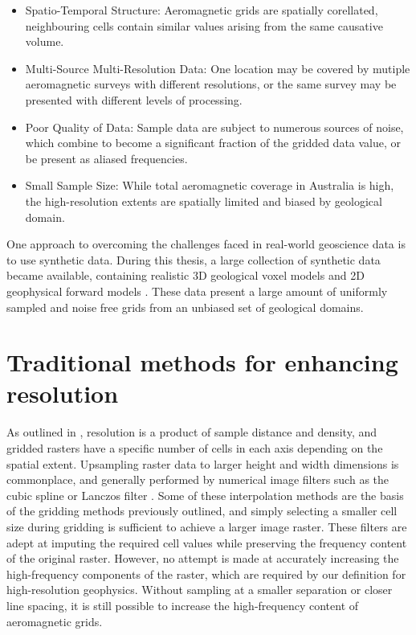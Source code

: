 \documentclass[manuscript.tex]{subfiles}
\begin{document}
\begin{itemize}
    \item{} Spatio-Temporal Structure: Aeromagnetic grids are spatially corellated, neighbouring cells contain similar values arising from the same causative volume.
    \item{} Multi-Source Multi-Resolution Data: One location may be covered by mutiple aeromagnetic surveys with different resolutions, or the same survey may be presented with different levels of processing.
    \item{} Poor Quality of Data: Sample data are subject to numerous sources of noise, which combine to become a significant fraction of the gridded data value, or be present as aliased frequencies.
    \item{} Small Sample Size: While total aeromagnetic coverage in Australia is high, the high-resolution extents are spatially limited and biased by geological domain.
\end{itemize}

One approach to overcoming the challenges faced in real-world geoscience data is to use synthetic data.
During this thesis, a large collection of synthetic data became available, containing realistic 3D geological voxel models and 2D geophysical forward models \parencite{jessellNoddyverseMassiveData2022}.
These data present a large amount of uniformly sampled and noise free grids from an unbiased set of geological domains.


\section{Traditional methods for enhancing resolution}
As outlined in , resolution is a product of sample distance and density, and gridded rasters have a specific number of cells in each axis depending on the spatial extent.
Upsampling raster data to larger height and width dimensions is commonplace, and generally performed by numerical image filters such as the cubic spline \parencite{keysCubicConvolutionInterpolation1981} or Lanczos filter \parencite{lanczos1988applied}.
Some of these interpolation methods are the basis of the gridding methods previously outlined, and simply selecting a smaller cell size during gridding is sufficient to achieve a larger image raster.
These filters are adept at imputing the required cell values while preserving the frequency content of the original raster.
However, no attempt is made at accurately increasing the high-frequency components of the raster, which are required by our definition for high-resolution geophysics.
Without sampling at a smaller separation or closer line spacing, it is still possible to increase the high-frequency content of aeromagnetic grids.
\end{document}
